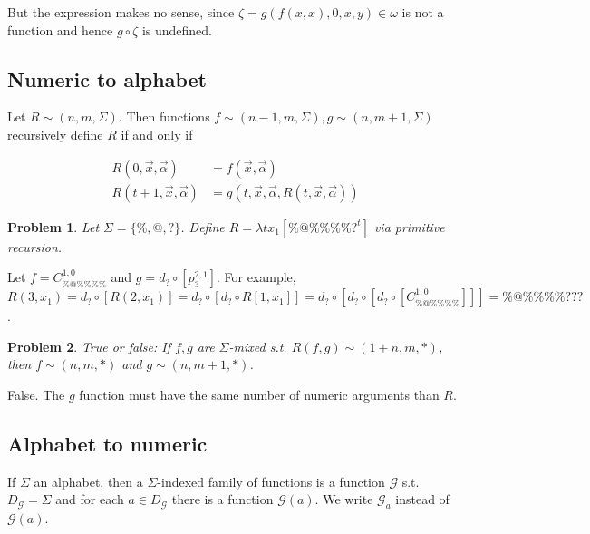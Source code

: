\documentclass[a4paper, 12pt]{article}
\newtheorem{problem}{Problem}
\newtheorem{problem}{Problem}
\begin{document}
But the expression makes no sense, since $\zeta = g(f(x, x), 0, x, y) \in
\omega$ is not a function and hence $g \circ \zeta$ is undefined.

\subsection{Numeric to alphabet}


Let $R \sim (n, m, \Sigma)$. Then functions $f \sim (n - 1, m, \Sigma),  g \sim (n,
m + 1, \Sigma)$ recursively define $R$ if and only if 

\begin{align*}
    R(0, \overrightarrow{x}, \overrightarrow{\alpha}) &= f(\overrightarrow{x},
    \overrightarrow{\alpha}) \\ 
    R(t + 1, \overrightarrow{x}, \overrightarrow{\alpha}) &= g \left(t,
    \overrightarrow{x}, \overrightarrow{\alpha}, R(t, \overrightarrow{x},
\overrightarrow{\alpha})  \right) 
\end{align*}

\begin{problem}
    Let $\Sigma = \{\%, @, ?\}$. Define $R = \lambda t x_1 [\% @ \% \% \% \%
    ?^{t}]$ via primitive recursion.
\end{problem}

Let $f = C_{\% @ \% \% \% \%}^{1, 0}$ and $g = d_{?}  \circ \left[ p_{3}^{2, 1}
\right] $. For example, $R(3, x_1) = 
d_? \circ \left[ R(2, x_1)
\right] = d_? \circ  \left[ d_? \circ R[1, x_1] \right] = d_? \circ \left[ d_?
\circ \left[ d_? \circ \left[ C_{\% @ \% \% \% \%}^{1, 0}  \right]  \right]
\right] = \% @ \% \% \% \% ? ? ? $.

\begin{problem}
    True or false: If $f, g$ are $\Sigma$-mixed s.t. $R(f, g) \sim (1 + n, m,
    *)$, then $f \sim (n, m, *)$ and $g \sim (n, m+1, *)$.
\end{problem}

False. The $g$ function must have the same number of numeric arguments than $R$.

\pagebreak 

\subsection{Alphabet to numeric}

If $\Sigma$ an alphabet, then a $\Sigma$-indexed family of functions is a
function $\mathcal{G}$ s.t. $D_{\mathcal{G}} = \Sigma$ and for each $a \in
D_{\mathcal{G}}$ there is a function $\mathcal{G}(a)$. We write $\mathcal{G}_a$
instead of $\mathcal{G}(a)$.
\end{document}
